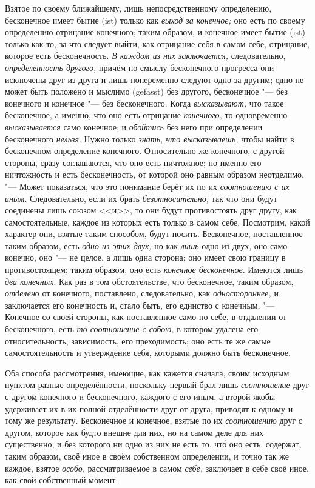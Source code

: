 Взятое по своему ближайшему, лишь непосредственному определению, бесконечное
имеет бытие (ist) только как {\em выход за конечное;}
оно есть по своему определению отрицание конечного; таким образом, и
конечное имеет бытие (ist) только как то, за что следует выйти, как
отрицание себя в самом себе, отрицание, которое есть бесконечность.
{\em В каждом из них заключается,} следовательно,
{\em определённость другого,} причём по смыслу
бесконечного прогресса они исключены друг из друга и лишь попеременно
следуют одно за другим; одно не может быть положено и мыслимо (gefasst) без
другого, бесконечное "--- без конечного и конечное "--- без бесконечного. Когда
{\em высказывают,} что такое бесконечное, а именно, что
оно есть отрицание {\em конечного,} то одновременно
{\em высказывается} само конечное; и
{\em обойтись} без него при определении бесконечного
{\em нельзя}. Нужно только
{\em знать, что высказываешь,} чтобы найти в
бесконечном определение конечного. Относительно же конечного, с другой
стороны, сразу соглашаются, что оно есть ничтожное; но именно его
ничтожность и есть бесконечность, от которой оно равным образом неотделимо.
"--- Может показаться, что это понимание берёт их по их
{\em соотношению с их иным}. Следовательно, если их
брать {\em безотносительно,} так что они будут
соединены лишь союзом <<и>>, то они будут противостоять друг другу, как
самостоятельные, каждое из которых есть только в самом себе. Посмотрим,
какой характер они, взятые таким способом, будут носить. Бесконечное,
поставленное таким образом, есть {\em одно из этих
двух;} но как {\em лишь} одно из двух, оно само
конечно, оно "--- не целое, а лишь одна сторона; оно имеет свою границу в
противостоящем; таким образом, оно есть {\em конечное
бесконечное}. Имеются лишь {\em два конечных}. Как раз
в том обстоятельстве, что бесконечное, таким образом,
{\em отделено} от конечного, поставлено, следовательно,
как {\em одностороннее,} и заключается его конечность
и, стало быть, его единство с конечным. "--- Конечное со своей стороны, как
поставленное само по себе, в отдалении от бесконечного, есть
{\em то соотношение с собою,} в котором удалена его
относительность, зависимость, его преходимость; оно есть те же самые
самостоятельность и утверждение себя, которыми должно быть бесконечное.

Оба способа рассмотрения, имеющие, как кажется сначала, своим исходным
пунктом разные определённости, поскольку первый брал лишь
{\em соотношение} друг с другом конечного и
бесконечного, каждого с его иным, а второй якобы удерживает их в их
полной отделённости друг от друга, приводят к одному и тому же результату.
Бесконечное и конечное, взятые по их {\em соотношению}
друг с другом, которое как будто внешне для них, но на самом деле для них
существенно, и без которого ни одно из них не есть то, чт\'{о} оно есть,
содержат, таким образом, своё иное в своём собственном определении, и
точно так же каждое, взятое {\em особо,}
рассматриваемое в самом {\em себе,} заключает в себе
своё иное, как свой собственный момент.

